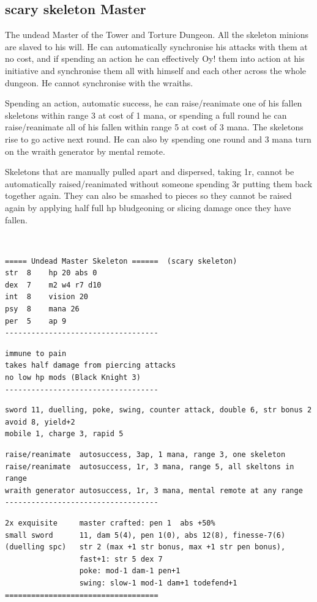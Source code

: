 \goodbreak
\subsection*{scary skeleton Master}
\label{skeletonmaster}

The undead Master of the Tower and Torture Dungeon. All the skeleton minions are slaved to his will. He can automatically synchronise his attacks with them at no cost, and if spending an action he can effectively Oy! them into action at his initiative and synchronise them all with himself and each other across the whole dungeon. He cannot synchronise with the wraiths.

Spending an action, automatic success, he can raise/reanimate one of his fallen skeletons within range 3 at cost of 1 mana, or spending a full round he can raise/reanimate all of his fallen within range 5 at cost of 3 mana. The skeletons rise to go active next round. He can also by spending one round and 3 mana turn on the wraith generator by mental remote.

Skeletons that are manually pulled apart and dispersed, taking 1r, cannot be automatically raised/reanimated without someone spending 3r putting them back together again. They can also be smashed to pieces so they cannot be raised again by applying half full hp bludgeoning or slicing damage once they have fallen.

\

\small \begin{samepage} \begin{verbatim}
===== Undead Master Skeleton ======  (scary skeleton)
str  8    hp 20 abs 0
dex  7    m2 w4 r7 d10
int  8    vision 20
psy  8    mana 26
per  5    ap 9
-----------------------------------
\end{verbatim} \goodbreak \begin{verbatim}
immune to pain
takes half damage from piercing attacks
no low hp mods (Black Knight 3)
-----------------------------------
\end{verbatim} \goodbreak \begin{verbatim}
sword 11, duelling, poke, swing, counter attack, double 6, str bonus 2
avoid 8, yield+2
mobile 1, charge 3, rapid 5 
\end{verbatim} \goodbreak \begin{verbatim}
raise/reanimate  autosuccess, 3ap, 1 mana, range 3, one skeleton
raise/reanimate  autosuccess, 1r, 3 mana, range 5, all skeltons in range
wraith generator autosuccess, 1r, 3 mana, mental remote at any range
-----------------------------------
\end{verbatim} \goodbreak \begin{verbatim}
2x exquisite     master crafted: pen 1  abs +50%
small sword      11, dam 5(4), pen 1(0), abs 12(8), finesse-7(6)
(duelling spc)   str 2 (max +1 str bonus, max +1 str pen bonus),
                 fast+1: str 5 dex 7
                 poke: mod-1 dam-1 pen+1
                 swing: slow-1 mod-1 dam+1 todefend+1
===================================
\end{verbatim} \end{samepage} \normalsize

